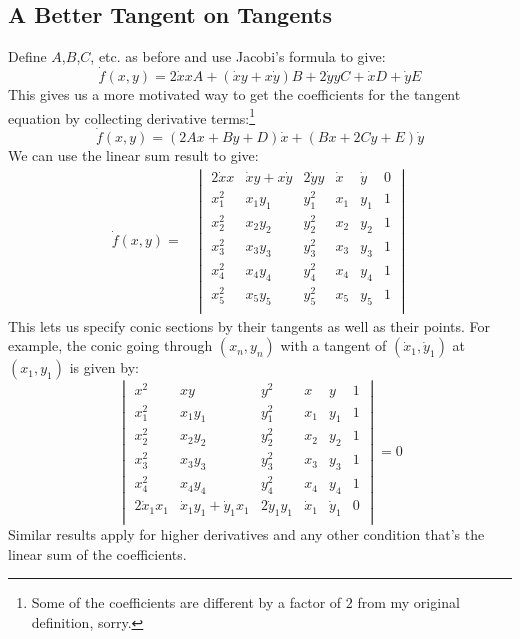 \subsection{A Better Tangent on Tangents}
Define $A$,$B$,$C$, etc. as before and use Jacobi's formula to give:
\[\dot{f}(x,y)=2\dot{x}xA+(\dot{x}y+x\dot{y})B+2\dot{y}yC+\dot{x}D+\dot{y}E\]
This gives us a more motivated way to get the coefficients for the tangent equation by collecting derivative terms:\footnote{
Some of the coefficients are different by a factor of $2$ from my original definition, sorry.}
\[\dot{f}(x,y)=(2Ax+By+D)\dot{x}+(Bx+2Cy+E)\dot{y}\]
We can use the linear sum result to give:
\[\begin{aligned}
	\dot{f}(x,y)
	=&\begin{vmatrix}
	2\dot{x}x&\dot{x}y+x\dot{y}&2\dot{y}y&\dot{x}&\dot{y}&0\\
	x_1^2&x_1y_1&y_1^2&x_1&y_1&1\\
	x_2^2&x_2y_2&y_2^2&x_2&y_2&1\\
	x_3^2&x_3y_3&y_3^2&x_3&y_3&1\\
	x_4^2&x_4y_4&y_4^2&x_4&y_4&1\\
	x_5^2&x_5y_5&y_5^2&x_5&y_5&1\\
	\end{vmatrix}
\end{aligned}\]
This lets us specify conic sections by their tangents as well as their points.
For example,
the conic going through $(x_n,y_n)$ with a tangent of $(\dot{x}_1,\dot{y}_1)$ at $(x_1,y_1)$ is given by:
\[
	\begin{vmatrix}
	x^2&xy&y^2&x&y&1\\
	x_1^2&x_1y_1&y_1^2&x_1&y_1&1\\
	x_2^2&x_2y_2&y_2^2&x_2&y_2&1\\
	x_3^2&x_3y_3&y_3^2&x_3&y_3&1\\
	x_4^2&x_4y_4&y_4^2&x_4&y_4&1\\
	2\dot{x}_1x_1&\dot{x}_1y_1+\dot{y}_1x_1&2\dot{y}_1y_1&\dot{x}_1&\dot{y}_1&0\\
	\end{vmatrix}=0
\]
Similar results apply for higher derivatives and any other condition that's the linear sum of the coefficients.

